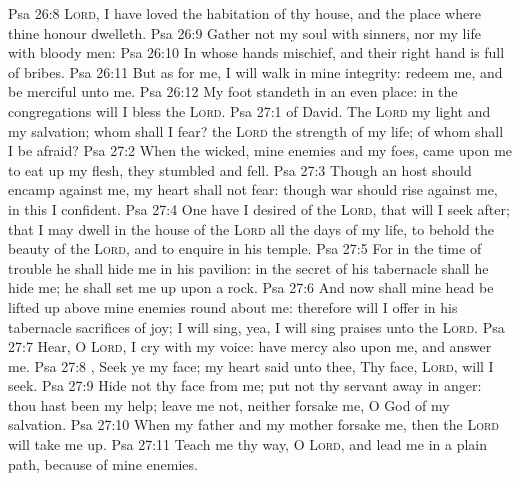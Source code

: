 \vs Psa 26:8 \textsc{Lord}, I have loved the habitation of thy house, and the place where thine honour dwelleth.
\vs Psa 26:9 Gather not my soul with sinners, nor my life with bloody men:
\vs Psa 26:10 In whose hands  mischief, and their right hand is full of bribes.
\vs Psa 26:11 But as for me, I will walk in mine integrity: redeem me, and be merciful unto me.
\vs Psa 26:12 My foot standeth in an even place: in the congregations will I bless the \textsc{Lord}.
\vs Psa 27:1  of David. The \textsc{Lord}  my light and my salvation; whom shall I fear? the \textsc{Lord}  the strength of my life; of whom shall I be afraid?
\vs Psa 27:2 When the wicked,  mine enemies and my foes, came upon me to eat up my flesh, they stumbled and fell.
\vs Psa 27:3 Though an host should encamp against me, my heart shall not fear: though war should rise against me, in this  I  confident.
\vs Psa 27:4 One  have I desired of the \textsc{Lord}, that will I seek after; that I may dwell in the house of the \textsc{Lord} all the days of my life, to behold the beauty of the \textsc{Lord}, and to enquire in his temple.
\vs Psa 27:5 For in the time of trouble he shall hide me in his pavilion: in the secret of his tabernacle shall he hide me; he shall set me up upon a rock.
\vs Psa 27:6 And now shall mine head be lifted up above mine enemies round about me: therefore will I offer in his tabernacle sacrifices of joy; I will sing, yea, I will sing praises unto the \textsc{Lord}.
\vs Psa 27:7 Hear, O \textsc{Lord},  I cry with my voice: have mercy also upon me, and answer me.
\vs Psa 27:8 , Seek ye my face; my heart said unto thee, Thy face, \textsc{Lord}, will I seek.
\vs Psa 27:9 Hide not thy face  from me; put not thy servant away in anger: thou hast been my help; leave me not, neither forsake me, O God of my salvation.
\vs Psa 27:10 When my father and my mother forsake me, then the \textsc{Lord} will take me up.
\vs Psa 27:11 Teach me thy way, O \textsc{Lord}, and lead me in a plain path, because of mine enemies.

